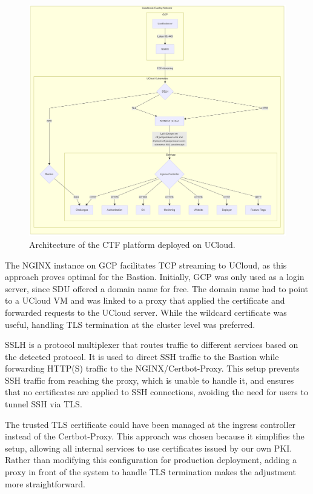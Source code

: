 \begin{figure}[h]
    \centering
    \includegraphics[width=1\textwidth]{images/ucloud-architecture.png}
    \caption{Architecture of the CTF platform deployed on UCloud.}
    \label{fig:architecture}
\end{figure}

The NGINX instance on GCP facilitates TCP streaming to UCloud, as this approach proves optimal for the Bastion. Initially, GCP was only used as a login server, since SDU offered a domain name for free. The domain name had to point to a UCloud VM and was linked to a proxy that applied the certificate and forwarded requests to the UCloud server. While the wildcard certificate was useful, handling TLS termination at the cluster level was preferred.

SSLH is a protocol multiplexer that routes traffic to different services based on the detected protocol. It is used to direct SSH traffic to the Bastion while forwarding HTTP(S) traffic to the NGINX/Certbot-Proxy. This setup prevents SSH traffic from reaching the proxy, which is unable to handle it, and ensures that no certificates are applied to SSH connections, avoiding the need for users to tunnel SSH via TLS.

The trusted TLS certificate could have been managed at the ingress controller instead of the Certbot-Proxy. This approach was chosen because it simplifies the setup, allowing all internal services to use certificates issued by our own PKI. Rather than modifying this configuration for production deployment, adding a proxy in front of the system to handle TLS termination makes the adjustment more straightforward.


